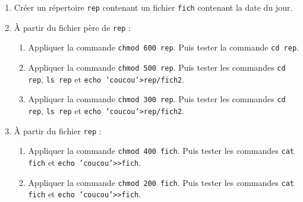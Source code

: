 \documentclass[a4paper,11pt]{exam}
\begin{document}
{
  \begin{enumerate}
   \item Créer un répertoire \texttt{rep} contenant un fichier \texttt{fich} contenant la date du jour.
   \item À partir du fichier père de \texttt{rep} :
      \begin{enumerate}
       \item Appliquer la commande \texttt{chmod 600 rep}. Puis tester la commande \texttt{cd rep}.
       \item Appliquer la commande \texttt{chmod 500 rep}. Puis tester les commandes \texttt{cd rep}, \texttt{ls rep} et \texttt{echo 'coucou'>rep/fich2}.
      \item Appliquer la commande \texttt{chmod 300 rep}. Puis tester les commandes \texttt{cd rep}, \texttt{ls rep} et \texttt{echo 'coucou'>rep/fich2}.
      \end{enumerate}
   \item À partir du fichier \texttt{rep} :
      \begin{enumerate}
       \item Appliquer la commande \texttt{chmod 400 fich}. Puis tester les commandes \texttt{cat fich} et \texttt{echo 'coucou'>>fich}.
       \item Appliquer la commande \texttt{chmod 200 fich}. Puis tester les commandes \texttt{cat fich} et \texttt{echo 'coucou'>>fich}.
      \end{enumerate}
  \end{enumerate}

}
\end{document}
